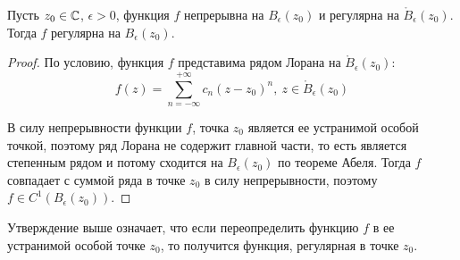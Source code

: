 \begin{proposition}
	Пусть $z_0 \in \mathbb{C}$, $\epsilon > 0$, функция $f$ непрерывна на $B_\epsilon(z_0)$ и регулярна на $\mathring B_\epsilon(z_0)$. Тогда $f$ регулярна на $B_\epsilon(z_0)$.
\end{proposition}

\begin{proof}
	По условию, функция $f$ представима рядом Лорана на $\mathring B_\epsilon(z_0)$:
	\[f(z) = \sum_{n = -\infty}^{+\infty}c_n(z-z_0)^n,~z \in \mathring B_\epsilon(z_0)\]
	
	В силу непрерывности функции $f$, точка $z_0$ является ее устранимой особой точкой, поэтому ряд Лорана не содержит главной части, то есть является степенным рядом и потому сходится на $B_\epsilon(z_0)$ по теореме Абеля. Тогда $f$ совпадает с суммой ряда в точке $z_0$ в силу непрерывности, поэтому $f \in C^1(B_\epsilon(z_0))$.
\end{proof}

\begin{note}
	Утверждение выше означает, что если переопределить функцию $f$ в ее устранимой особой точке $z_0$, то получится функция, регулярная в точке $z_0$.
\end{note}